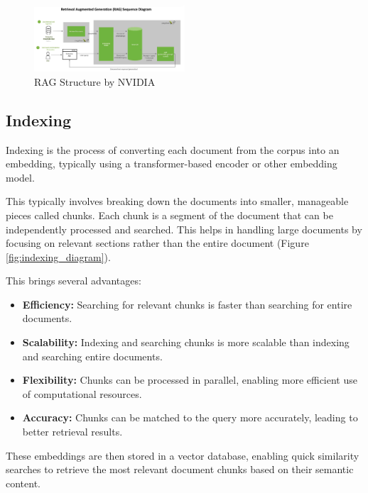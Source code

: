 \documentclass[conference]{IEEEtran}
\begin{document}
\begin{figure}[htbp!]
    \centerline{\includegraphics[width=0.5\textwidth]{images/NVIDIA-RAG-diagram-scaled.jpg}}
    \caption{RAG Structure by NVIDIA \cite{merritt_what_2024}}
    \label{fig:rag_structure}
\end{figure}

\subsection{Indexing}
Indexing is the process of converting each document from the corpus into an embedding,
typically using a transformer-based encoder or other embedding model.

This typically involves breaking down the documents into smaller, manageable
pieces called chunks. Each chunk is a segment of the document that can be independently processed and searched.
This helps in handling large documents by focusing on relevant sections rather than the entire document (Figure \ref{fig:indexing_diagram}).

This brings several advantages:
\begin{itemize}
    \item \textbf{Efficiency:} Searching for relevant chunks is faster than searching for entire documents.
    \item \textbf{Scalability:} Indexing and searching chunks is more scalable than indexing and searching entire documents.
    \item \textbf{Flexibility:} Chunks can be processed in parallel, enabling more efficient use of computational resources.
    \item \textbf{Accuracy:} Chunks can be matched to the query more accurately, leading to better retrieval results.
\end{itemize}

These embeddings are then stored in a vector database, enabling quick similarity
searches to retrieve the most relevant document chunks based on their semantic content.
\end{document}
